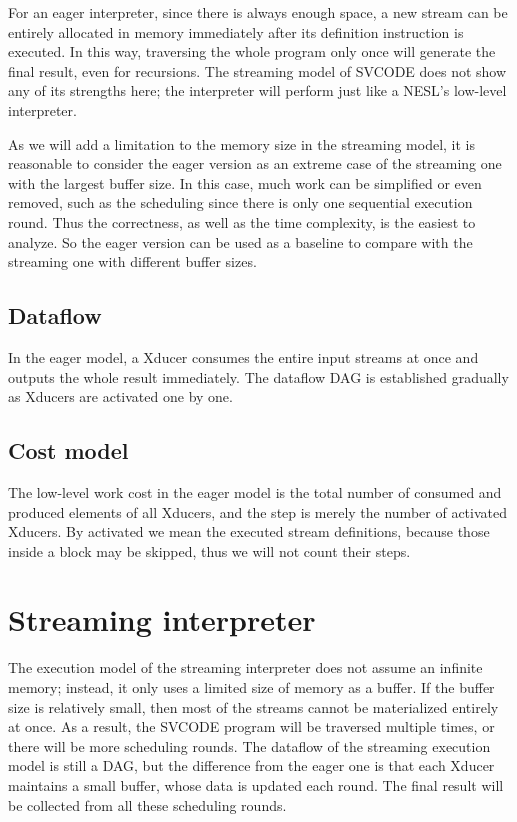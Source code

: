 For an eager interpreter, since there is always enough space, a  new stream can be entirely allocated in memory immediately after its definition instruction is executed.
In this way, traversing the whole program only once will generate the final result, even for recursions.
The streaming model of SVCODE does not show any of its strengths here; the interpreter will perform just like a NESL's low-level interpreter. 


As we will add a limitation to the memory size in the streaming model, it is reasonable to consider the eager version as an extreme case  of the streaming one with the largest buffer size. 
In this case, much work can be simplified or even removed, such as the scheduling since there is only one sequential execution round. 
Thus the correctness, as well as the time complexity, is the easiest to analyze. 
So the eager version can be used as a baseline to compare with the streaming one with different buffer sizes.


\subsection{Dataflow}
In the eager model, a Xducer consumes the entire input streams at once and outputs the whole result immediately. 
The dataflow DAG is established gradually as Xducers are activated one by one.   


\subsection{Cost model}
The low-level work cost in the eager model is the total number of consumed and produced elements of all Xducers, and the step is merely the number of activated Xducers. 
By activated we mean the executed stream definitions, because those inside a \wc block may be skipped, thus we will not count their steps. 



\section{Streaming interpreter}

The execution model of the streaming interpreter does not assume an infinite memory; instead, it only uses a limited size of memory as a buffer. 
If the buffer size is relatively small, then most of the streams cannot be materialized entirely at once. 
As a result, the SVCODE program will be traversed multiple times, or there will be more scheduling rounds. 
The dataflow of the streaming execution model is still a DAG, but the difference from the eager one is that each Xducer maintains a small buffer, whose data is updated each round. 
The final result will be collected from all these scheduling rounds.

